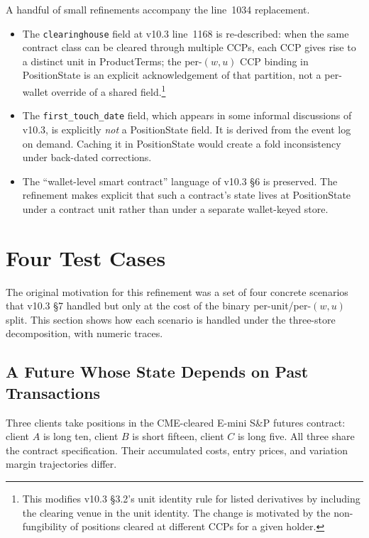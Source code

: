 \documentclass[11pt,a4paper]{article}
\begin{document}
A handful of small refinements accompany the line~1034 replacement.
\begin{itemize}[leftmargin=*]
\item The \texttt{clearinghouse} field at v10.3 line~1168 is re-described: when the same contract class can be cleared through multiple CCPs, each CCP gives rise to a distinct unit in ProductTerms; the per-$(w, u)$ CCP binding in PositionState is an explicit acknowledgement of that partition, not a per-wallet override of a shared field.\footnote{This modifies v10.3 \S 3.2's unit identity rule for listed derivatives by including the clearing venue in the unit identity. The change is motivated by the non-fungibility of positions cleared at different CCPs for a given holder.}
\item The \texttt{first\_touch\_date} field, which appears in some informal discussions of v10.3, is explicitly \emph{not} a PositionState field. It is derived from the event log on demand. Caching it in PositionState would create a fold inconsistency under back-dated corrections.
\item The ``wallet-level smart contract'' language of v10.3 \S 6 is preserved. The refinement makes explicit that such a contract's state lives at PositionState under a contract unit rather than under a separate wallet-keyed store.
\end{itemize}

\clearpage
\section{Four Test Cases}
\label{sec:testcases}

The original motivation for this refinement was a set of four concrete scenarios that v10.3 \S 7 handled but only at the cost of the binary per-unit/per-$(w,u)$ split. This section shows how each scenario is handled under the three-store decomposition, with numeric traces.

\subsection{A Future Whose State Depends on Past Transactions}
\label{sec:future}

Three clients take positions in the CME-cleared E-mini S\&P futures contract: client $A$ is long ten, client $B$ is short fifteen, client $C$ is long five. All three share the contract specification. Their accumulated costs, entry prices, and variation margin trajectories differ.
\end{document}
